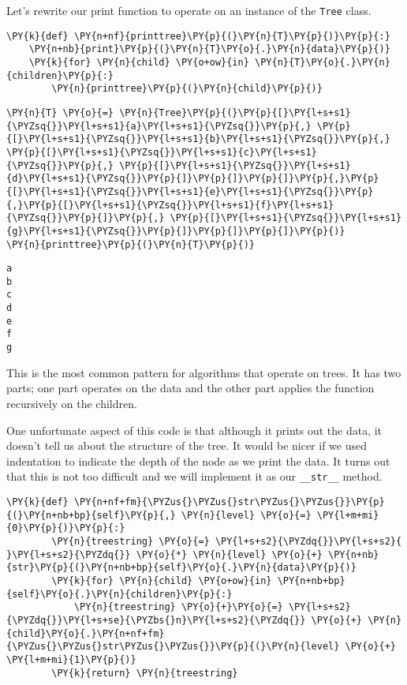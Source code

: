 Let's rewrite our print function to operate on an instance of the \texttt{Tree} class.

\begin{Verbatim}[commandchars=\\\{\}]
\PY{k}{def} \PY{n+nf}{printtree}\PY{p}{(}\PY{n}{T}\PY{p}{)}\PY{p}{:}
    \PY{n+nb}{print}\PY{p}{(}\PY{n}{T}\PY{o}{.}\PY{n}{data}\PY{p}{)}
    \PY{k}{for} \PY{n}{child} \PY{o+ow}{in} \PY{n}{T}\PY{o}{.}\PY{n}{children}\PY{p}{:}
        \PY{n}{printtree}\PY{p}{(}\PY{n}{child}\PY{p}{)}
\end{Verbatim}



\begin{Verbatim}[commandchars=\\\{\}]
\PY{n}{T} \PY{o}{=} \PY{n}{Tree}\PY{p}{(}\PY{p}{[}\PY{l+s+s1}{\PYZsq{}}\PY{l+s+s1}{a}\PY{l+s+s1}{\PYZsq{}}\PY{p}{,} \PY{p}{[}\PY{l+s+s1}{\PYZsq{}}\PY{l+s+s1}{b}\PY{l+s+s1}{\PYZsq{}}\PY{p}{,} \PY{p}{[}\PY{l+s+s1}{\PYZsq{}}\PY{l+s+s1}{c}\PY{l+s+s1}{\PYZsq{}}\PY{p}{,} \PY{p}{[}\PY{l+s+s1}{\PYZsq{}}\PY{l+s+s1}{d}\PY{l+s+s1}{\PYZsq{}}\PY{p}{]}\PY{p}{]}\PY{p}{]}\PY{p}{,}\PY{p}{[}\PY{l+s+s1}{\PYZsq{}}\PY{l+s+s1}{e}\PY{l+s+s1}{\PYZsq{}}\PY{p}{,}\PY{p}{[}\PY{l+s+s1}{\PYZsq{}}\PY{l+s+s1}{f}\PY{l+s+s1}{\PYZsq{}}\PY{p}{]}\PY{p}{,} \PY{p}{[}\PY{l+s+s1}{\PYZsq{}}\PY{l+s+s1}{g}\PY{l+s+s1}{\PYZsq{}}\PY{p}{]}\PY{p}{]}\PY{p}{]}\PY{p}{)}
\PY{n}{printtree}\PY{p}{(}\PY{n}{T}\PY{p}{)}
\end{Verbatim}

\begin{Verbatim}
a
b
c
d
e
f
g
\end{Verbatim}


This is the most common pattern for algorithms that operate on trees.
It has two parts; one part operates on the data and the other part applies the function recursively on the children.


One unfortunate aspect of this code is that although it prints out the data, it doesn't tell us about the structure of the tree.
It would be nicer if we used indentation to indicate the depth of the node as we print the data.
It turns out that this is not too difficult and we will implement it as our \texttt{\_\_str\_\_} method.

\begin{Verbatim}[commandchars=\\\{\}]
    \PY{k}{def} \PY{n+nf+fm}{\PYZus{}\PYZus{}str\PYZus{}\PYZus{}}\PY{p}{(}\PY{n+nb+bp}{self}\PY{p}{,} \PY{n}{level} \PY{o}{=} \PY{l+m+mi}{0}\PY{p}{)}\PY{p}{:}
        \PY{n}{treestring} \PY{o}{=} \PY{l+s+s2}{\PYZdq{}}\PY{l+s+s2}{  }\PY{l+s+s2}{\PYZdq{}} \PY{o}{*} \PY{n}{level} \PY{o}{+} \PY{n+nb}{str}\PY{p}{(}\PY{n+nb+bp}{self}\PY{o}{.}\PY{n}{data}\PY{p}{)}
        \PY{k}{for} \PY{n}{child} \PY{o+ow}{in} \PY{n+nb+bp}{self}\PY{o}{.}\PY{n}{children}\PY{p}{:}
            \PY{n}{treestring} \PY{o}{+}\PY{o}{=} \PY{l+s+s2}{\PYZdq{}}\PY{l+s+se}{\PYZbs{}n}\PY{l+s+s2}{\PYZdq{}} \PY{o}{+} \PY{n}{child}\PY{o}{.}\PY{n+nf+fm}{\PYZus{}\PYZus{}str\PYZus{}\PYZus{}}\PY{p}{(}\PY{n}{level} \PY{o}{+} \PY{l+m+mi}{1}\PY{p}{)}
        \PY{k}{return} \PY{n}{treestring}
\end{Verbatim}



